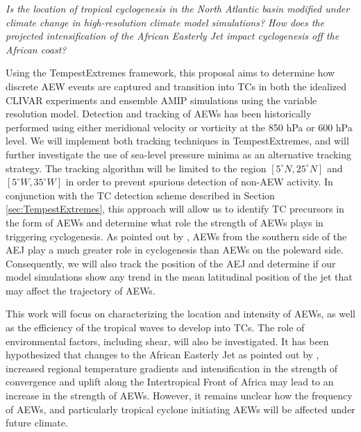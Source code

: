 \documentclass[11pt]{article}
\begin{document}
\textit{Is the location of tropical cyclogenesis in the North Atlantic basin modified under climate change in high-resolution climate model simulations? How does the projected intensification of the African Easterly Jet impact cyclogenesis off the African coast?}

Using the TempestExtremes framework, this proposal aims to determine how discrete AEW events are captured and transition into TCs in both the idealized CLIVAR experiments and ensemble AMIP simulations using the variable resolution model.  Detection and tracking of AEWs has been historically performed using either meridional velocity \citep{Burpee1974, Reed1977} or vorticity \citep{hodges1995feature, thorncroft2001african} at the 850 hPa or 600 hPa level.  We will implement both tracking techniques in TempestExtremes, and will further investigate the use of sea-level pressure minima as an alternative tracking strategy.  The tracking algorithm will be limited to the region $[5^\circ N, 25^\circ N]$ and $[5^\circ W, 35^\circ W]$ in order to prevent spurious detection of non-AEW activity.  In conjunction with the TC detection scheme described in Section \ref{sec:TempestExtremes}, this approach will allow us to identify TC precursors in the form of AEWs and determine what role the strength of AEWs plays in triggering cyclogenesis.  As pointed out by \cite{thorncroft2001african}, AEWs from the southern side of the AEJ play a much greater role in cyclogenesis than AEWs on the poleward side.  Consequently, we will also track the position of the AEJ and determine if our model simulations show any trend in the mean latitudinal position of the jet that may affect the trajectory of AEWs.

This work will focus on characterizing the location and intensity of AEWs, as well as the efficiency of the tropical waves to develop into TCs.  The role of environmental factors, including shear, will also be investigated. It has been hypothesized that changes to the African Easterly Jet as pointed out by \cite{skinner2013contribution}, increased regional temperature gradients and intensification in the strength of convergence and uplift along the Intertropical Front of Africa may lead to an increase in the strength of AEWs.  However, it remains unclear how the frequency of AEWs, and particularly tropical cyclone initiating AEWs will be affected under future climate.



\end{document}
